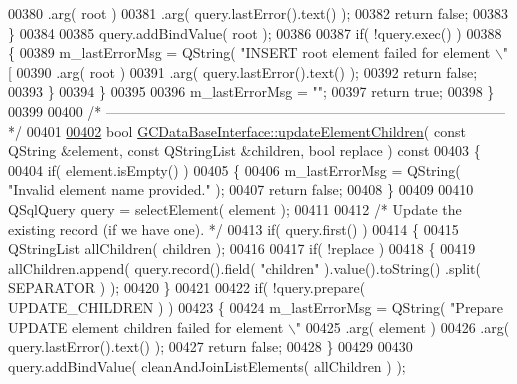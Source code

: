 \begin{DoxyCode}
{{{{{{{{{{{{{{{      %
00380           .arg( root )
00381           .arg( query.lastError().text() );
00382       \textcolor{keywordflow}{return} \textcolor{keyword}{false};
00383     \}
00384 
00385     query.addBindValue( root );
00386 
00387     \textcolor{keywordflow}{if}( !query.exec() )
00388     \{
00389       m\_lastErrorMsg = QString( \textcolor{stringliteral}{"INSERT root element failed for element \(\backslash\)"%
       [%
00390           .arg( root )
00391           .arg( query.lastError().text() );
00392       \textcolor{keywordflow}{return} \textcolor{keyword}{false};
00393     \}
00394   \}
00395 
00396   m\_lastErrorMsg = \textcolor{stringliteral}{""};
00397   \textcolor{keywordflow}{return} \textcolor{keyword}{true};
00398 \}
00399 
00400 \textcolor{comment}{/*
      --------------------------------------------------------------------------------------*/}
00401 
\hypertarget{gcdatabaseinterface_8cpp_source_l00402}{}\hyperlink{class_g_c_data_base_interface_a91a60134bfb21a3f49d826340bebb852}{00402} \textcolor{keywordtype}{bool} \hyperlink{class_g_c_data_base_interface_a91a60134bfb21a3f49d826340bebb852}{GCDataBaseInterface::updateElementChildren}( \textcolor{keyword}{const} QString &element, \textcolor{keyword}{const} 
      QStringList &children, \textcolor{keywordtype}{bool} replace )\textcolor{keyword}{ const}
00403 \textcolor{keyword}{}\{
00404   \textcolor{keywordflow}{if}( element.isEmpty() )
00405   \{
00406     m\_lastErrorMsg = QString( \textcolor{stringliteral}{"Invalid element name provided."} );
00407     \textcolor{keywordflow}{return} \textcolor{keyword}{false};
00408   \}
00409 
00410   QSqlQuery query = selectElement( element );
00411 
00412   \textcolor{comment}{/* Update the existing record (if we have one). */}
00413   \textcolor{keywordflow}{if}( query.first() )
00414   \{
00415     QStringList allChildren( children );
00416 
00417     \textcolor{keywordflow}{if}( !replace )
00418     \{
00419       allChildren.append( query.record().field( \textcolor{stringliteral}{"children"} ).value().toString()
      .split( SEPARATOR ) );
00420     \}
00421 
00422     \textcolor{keywordflow}{if}( !query.prepare( UPDATE\_CHILDREN ) )
00423     \{
00424       m\_lastErrorMsg = QString( \textcolor{stringliteral}{"Prepare UPDATE element children failed for
       element \(\backslash\)"%
00425           .arg( element )
00426           .arg( query.lastError().text() );
00427       \textcolor{keywordflow}{return} \textcolor{keyword}{false};
00428     \}
00429 
00430     query.addBindValue( cleanAndJoinListElements( allChildren ) );
}}}}}}}}}}}}}}}}}
\end{DoxyCode}
